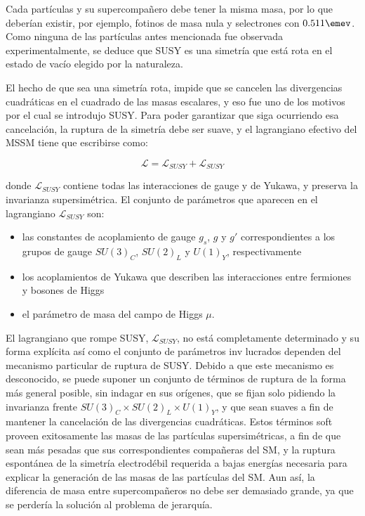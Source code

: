 Cada partículas y su supercompañero debe tener la misma masa, por lo que deberían existir, por ejemplo, fotinos de masa nula y selectrones con $0.511 \emev$. Como ninguna de las partículas antes mencionada fue observada experimentalmente, se deduce que SUSY es una simetría que está rota en el estado de vacío elegido por la naturaleza.

El hecho de que sea una simetría rota, impide que se cancelen las divergencias cuadráticas en el cuadrado de las masas escalares, y eso fue uno de los motivos por el cual se introdujo SUSY. Para poder garantizar que siga ocurriendo esa cancelación, la ruptura de la simetría debe ser suave, y el lagrangiano efectivo del MSSM tiene que escribirse como:

\begin{equation}
\mathcal{L}=\mathcal{L}_{SUSY}+\mathcal{L}_{SUSY}
\end{equation}

donde $\mathcal{L}_{SUSY}$ contiene todas las interacciones de gauge y de Yukawa, y preserva la invarianza supersimétrica. El conjunto de parámetros que aparecen en el lagrangiano $\mathcal{L}_{SUSY}$ son:

\begin{itemize}

	\item las constantes de acoplamiento de gauge $g_{s}$, $g$ y $g'$ correspondientes a los grupos de gauge $SU(3)_{C}$, $SU(2)_{L}$ y $U(1)_{Y}$, respectivamente

	\item los acoplamientos de Yukawa que describen las interacciones entre fermiones y bosones de Higgs

	\item el parámetro de masa del campo de Higgs $\mu$.

\end{itemize}


El lagrangiano que rompe SUSY, $\mathcal{L}_{SUSY}$, no está completamente determinado y su forma explícita así como el conjunto de parámetros inv lucrados dependen del mecanismo particular de ruptura de SUSY. Debido a que este mecanismo es desconocido, se puede suponer un conjunto de términos de
ruptura de la forma más general posible, sin indagar en sus orígenes, que se fijan solo pidiendo la invarianza frente $SU(3)_{C}\times SU(2)_{L}\times U(1)_{Y}$, y que sean suaves a fin de mantener la cancelación de las divergencias cuadráticas. Estos términos soft proveen exitosamente las masas de las partículas supersimétricas, a fin de que sean más pesadas que sus correspondientes compañeras del SM, y la ruptura espontánea de la simetría electrodébil requerida a bajas energías necesaria para explicar la generación de las masas de las partículas del SM. Aun así, la diferencia de masa entre supercompañeros no debe ser demasiado grande, ya que se perdería la solución al problema de jerarquía.

